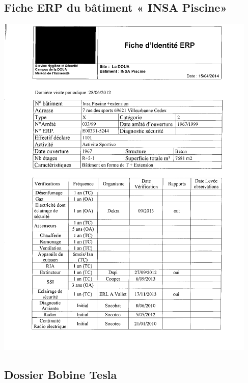 \documentclass[hidelinks, paper=a4, fontsize=13pt]{report}
\begin{document}
\subsection{Fiche ERP du bâtiment « INSA Piscine»}
\begin{center}
\includegraphics[scale=1.2]{Annexes/Documents/ERPPiscine}
\end{center}

\subsection{Dossier Bobine Tesla}
\begin{center}

\end{center}
\end{document}
